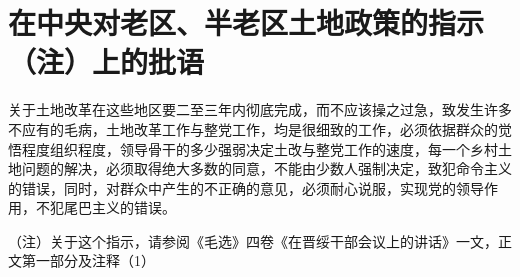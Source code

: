\section[在中央对老区、半老区土地政策的指示（注）上的批语（一九四八年二月二十二日）]{在中央对老区、半老区土地政策的指示（注）上的批语}


关于土地改革在这些地区要二至三年内彻底完成，而不应该操之过急，致发生许多不应有的毛病，土地改革工作与整党工作，均是很细致的工作，必须依据群众的觉悟程度组织程度，领导骨干的多少强弱决定土改与整党工作的速度，每一个乡村土地问题的解决，必须取得绝大多数的同意，不能由少数人强制决定，致犯命令主义的错误，同时，对群众中产生的不正确的意见，必须耐心说服，实现党的领导作用，不犯尾巴主义的错误。

（注）关于这个指示，请参阅《毛选》四卷《在晋绥干部会议上的讲话》一文，正文第一部分及注释（1）

